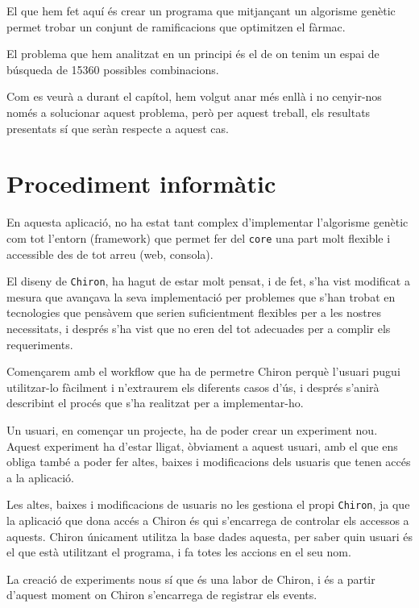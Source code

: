 \documentclass[titlepage,a4paper,12pt]{book}
\begin{document}
	El que hem fet aquí és crear un programa que mitjançant un algorisme
	genètic permet trobar un conjunt de ramificacions que optimitzen el fàrmac.

	El problema que hem analitzat en un principi és el de %
	on tenim un espai de búsqueda de 15360 possibles combinacions.

	Com es veurà a durant el capítol, hem volgut anar més enllà i no cenyir-nos
	només a solucionar aquest problema, però per aquest treball, els resultats
	presentats sí que seràn respecte a aquest cas.

\section{Procediment informàtic} %
\label{sec:Procediment informatic}

En aquesta aplicació, no ha estat tant complex d'implementar l'algorisme genètic
com tot l'entorn (framework) que permet fer del \texttt{core} una part molt
flexible i accessible des de tot arreu (web, consola).

El diseny de \texttt{Chiron}, ha hagut de estar molt pensat, i de fet, s'ha vist
modificat a mesura que avançava la seva implementació per problemes que s'han
trobat en tecnologies que pensàvem que serien suficientment flexibles per a les
nostres necessitats, i després s'ha vist que no eren del tot adecuades per a
complir els requeriments.

Començarem amb el workflow que ha de permetre Chiron perquè l'usuari pugui
utilitzar-lo fàcilment i n'extraurem els diferents casos d'ús, i després
s'anirà describint el procés que s'ha realitzat per a implementar-ho.

Un usuari, en començar un projecte, ha de poder crear un experiment nou.  Aquest
experiment ha d'estar lligat, òbviament a aquest usuari, amb el que ens obliga
també a poder fer altes, baixes i modificacions dels usuaris que tenen accés a
la aplicació.

Les altes, baixes i modificacions de usuaris no les gestiona el propi
\texttt{Chiron}, ja que la aplicació que dona accés a Chiron és qui s'encarrega
de controlar els accessos a aquests.  Chiron únicament utilitza la base dades
aquesta, per saber quin usuari és el que està utilitzant el programa, i fa totes
les accions en el seu nom.

La creació de experiments nous sí que és una labor de Chiron, i és a partir
d'aquest moment on Chiron s'encarrega de registrar els events.
\end{document}
